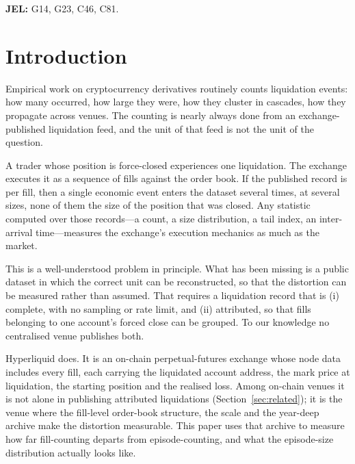 \documentclass[11pt,a4paper]{article}
\begin{document}
\noindent\textbf{JEL:} G14, G23, C46, C81.

\section{Introduction}

Empirical work on cryptocurrency derivatives routinely counts liquidation events: how many
occurred, how large they were, how they cluster in cascades, how they propagate across venues.
The counting is nearly always done from an exchange-published liquidation feed, and the unit of
that feed is not the unit of the question.

A trader whose position is force-closed experiences one liquidation. The exchange executes it as
a sequence of fills against the order book. If the published record is per fill, then a single
economic event enters the dataset several times, at several sizes, none of them the size of the
position that was closed. Any statistic computed over those records---a count, a size
distribution, a tail index, an inter-arrival time---measures the exchange's execution mechanics
as much as the market.

This is a well-understood problem in principle. What has been missing is a public dataset in
which the correct unit can be reconstructed, so that the distortion can be measured rather than
assumed. That requires a liquidation record that is (i) complete, with no sampling or rate limit,
and (ii) attributed, so that fills belonging to one account's forced close can be grouped. To our
knowledge no centralised venue publishes both.

Hyperliquid does. It is an on-chain perpetual-futures exchange whose node data includes every
fill, each carrying the liquidated account address, the mark price at liquidation, the starting
position and the realised loss. Among on-chain venues it is not alone in publishing attributed
liquidations (Section~\ref{sec:related}); it is the venue where the fill-level order-book
structure, the scale and the year-deep archive make the distortion measurable. This paper uses that archive to measure how far fill-counting
departs from episode-counting, and what the episode-size distribution actually looks like.
\end{document}
